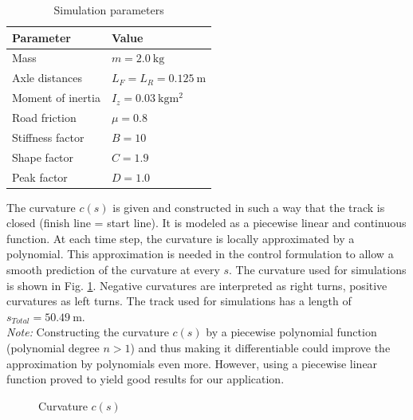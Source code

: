 \begin{table}
\centering
\caption{Simulation parameters}
\begin{tabular}{l|l}
Parameter & Value\\
\hline
Mass& $m=\SI{2.0}{\kilo\gram}$\\
Axle distances&$L_F=L_R = \SI{0.125}{\meter}$\\
Moment of inertia&$I_z = \SI{0.03}{\kilo\gram\square\meter}$\\
Road friction&$\mu = 0.8$\\
Stiffness factor & $B=10$\\ 
Shape factor & $C=1.9$\\
Peak factor & $D=1.0$
\end{tabular}
\end{table}
The curvature $c(s)$ is given and constructed in such a way that the track is closed (finish line = start line). It is modeled as a piecewise linear and continuous function. At each time step, the curvature is locally approximated by a polynomial. This approximation is needed in the control formulation to allow a smooth prediction of the curvature at every $s$. The curvature used for simulations is shown in Fig. \ref{fig:Sim_curv}. Negative curvatures are interpreted as right turns, positive curvatures as left turns. The track used for simulations has a length of $s_{Total} = \SI{50.49}{\meter}$.\\
\emph{Note:} Constructing the curvature $c(s)$ by a piecewise polynomial function (polynomial degree $n>1$) and thus making it differentiable could improve the approximation by polynomials even more. However, using a piecewise linear function proved to yield good results for our application.
\begin{figure}[ht]
	\centering
  	
  	\caption{Curvature $c(s)$}
	\label{fig:Sim_curv}
\end{figure}
\\
